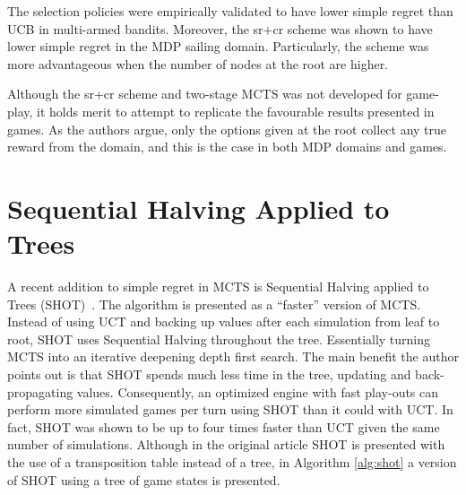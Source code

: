 \documentclass{kecsmstr}
\begin{document}
The selection policies were empirically validated to have lower simple regret than UCB in multi-armed bandits. Moreover, the {\sc sr+cr} scheme was shown to have lower simple regret in the MDP sailing domain. Particularly, the scheme was more advantageous when the number of nodes at the root are higher.

Although the {\sc sr+cr} scheme and two-stage MCTS was not developed for game-play, it holds merit to attempt to replicate the favourable results presented in games. As the authors argue, only the options given at the root collect any true reward from the domain, and this is the case in both MDP domains and games.
\newpage
\section{Sequential Halving Applied to Trees}
\label{sec:SHOT}

A recent addition to simple regret in MCTS is Sequential Halving applied to Trees (SHOT)~. The algorithm is presented as a ``faster'' version of MCTS.  Instead of using UCT and backing up values after each simulation from leaf to root, SHOT uses Sequential Halving throughout the tree. Essentially turning MCTS into an iterative deepening depth first search. The main benefit the author points out is that SHOT spends much less time in the tree, updating and back-propagating values. Consequently, an optimized engine with fast play-outs can perform more simulated games per turn using SHOT than it could with UCT. In fact, SHOT was shown to be up to four times faster than UCT given the same number of simulations. Although in the original article SHOT is presented with the use of a transposition table instead of a tree, in Algorithm \ref{alg:shot} a version of SHOT using a tree of game states is presented.
\end{document}
